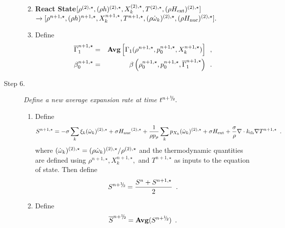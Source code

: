 \begin{description}
\begin{enumerate}
\renewcommand{\theenumi}{{\bf \alph{enumi}}}

\item {\bf React State}$[ \rho^{(2),\star},(\rho h)^{(2),\star}, X_k^{(2),\star}, 
                             T^{(2),\star}, (\rho{H_{\rm ext}})^{(2),\star}] $\\
$\rightarrow [ \rho^{n+1,\star},(\rho h)^{n+1,\star}, X_k^{n+1,\star}, T^{n+1,\star}, 
              (\rho \dot{\omega}_k)^{(2),\star}, (\rho {H_{\rm nuc}})^{(2),\star} ].$  

\item Define
\begin{eqnarray}
 \overline{\Gamma}_1^{n+1,\star}    &=& {\rm{\bf Avg}} \left[ \Gamma_1(\rho^{n+1,\star}, p_0^{n+1,\star}, 
                                                      X_k^{n+1,\star}) \right] \enskip , \\
 {\beta   }_0^{n+1,\star}    &=& \beta   \left(\rho_0^{n+1,\star}, p_0^{n+1,\star}, \overline{\Gamma}_1^{n+1,\star}\right) \enskip .
\end{eqnarray}

\end{enumerate}

\item[Step 6.] {\em Define a new average expansion rate at time $t^\nph.$}

\begin{enumerate}
\renewcommand{\theenumi}{{\bf \alph{enumi}}}
\item Define
\begin{equation}
  S^{n+1,\star} =  -\sigma  \sum_k  \xi_k  (\dot{\omega}_k)^{(2),\star}  + 
  \sigma {H_{\rm nuc}}^{(2),\star} +
  \frac{1}{\rho p_\rho} \sum_k p_{X_k}  ({\dot{\omega}}_k)^{(2),\star}  
  + \sigma {H_{\rm ext}} + \frac{\sigma}{\rho}\nabla\cdot k_{\rm th}\nabla T^{n+1,\star} \enskip .
\end{equation} 
where $(\dot{\omega}_k)^{(2),\star} = (\rho \dot{\omega}_k)^{(2),\star} / \rho^{(2),\star}$
and the thermodynamic quantities are defined using $\rho^{n+1,\star}, X_k^{n+1,\star},$ 
and $T^{n+1,\star}$ as inputs to the equation of state.
Then define
\begin{equation}
 S^\nph = \frac{S^n + S^{n+1,\star}}{2} \enskip. 
\end{equation}

\item Define
\begin{equation}
\overline{S}^{\nph} = {\mathrm{\bf Avg}} (S^{\nph}) \enskip.
\end{equation}


\end{enumerate}
\end{description}
